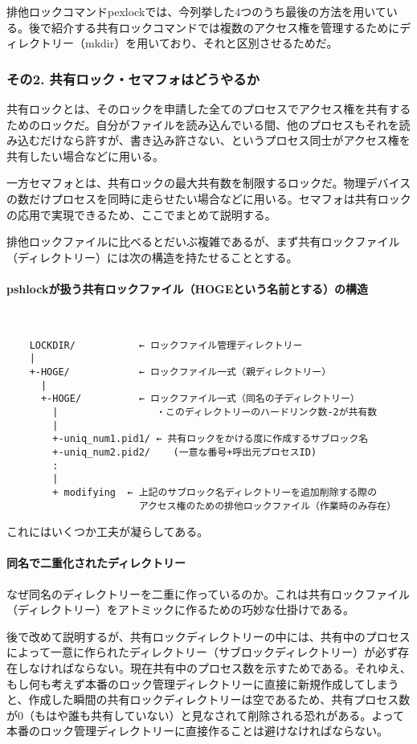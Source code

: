 排他ロックコマンドpexlockでは、今列挙した4つのうち最後の方法を用いている。後で紹介する共有ロックコマンドでは複数のアクセス権を管理するためにディレクトリー（mkdir）を用いており、それと区別させるためだ。

\subsubsection*{その2. 共有ロック・セマフォはどうやるか}
共有ロックとは、そのロックを申請した全てのプロセスでアクセス権を共有するためのロックだ。自分がファイルを読み込んでいる間、他のプロセスもそれを読み込むだけなら許すが、書き込み許さない、というプロセス同士がアクセス権を共有したい場合などに用いる。

一方セマフォとは、共有ロックの最大共有数を制限するロックだ。物理デバイスの数だけプロセスを同時に走らせたい場合などに用いる。セマフォは共有ロックの応用で実現できるため、ここでまとめて説明する。

排他ロックファイルに比べるとだいぶ複雑であるが、まず共有ロックファイル（ディレクトリー）には次の構造を持たせることとする。\paragraph{pshlockが扱う共有ロックファイル（HOGEという名前とする）の構造}　\\
\begin{frameboxit}{160.0mm}
\begin{verbatim}
	LOCKDIR/           ← ロックファイル管理ディレクトリー
	|
	+-HOGE/            ← ロックファイル一式（親ディレクトリー）
	  |
	  +-HOGE/          ← ロックファイル一式（同名の子ディレクトリー）
	    |                 ・このディレクトリーのハードリンク数-2が共有数
	    |
	    +-uniq_num1.pid1/ ← 共有ロックをかける度に作成するサブロック名
	    +-uniq_num2.pid2/    (一意な番号+呼出元プロセスID)
	    :
	    |
	    + modifying  ← 上記のサブロック名ディレクトリーを追加削除する際の
	                   アクセス権のための排他ロックファイル（作業時のみ存在）
\end{verbatim}
\end{frameboxit}
これにはいくつか工夫が凝らしてある。
\paragraph{同名で二重化されたディレクトリー}
なぜ同名のディレクトリーを二重に作っているのか。これは共有ロックファイル（ディレクトリー）をアトミックに作るための巧妙な仕掛けである。

後で改めて説明するが、共有ロックディレクトリーの中には、共有中のプロセスによって一意に作られたディレクトリー（サブロックディレクトリー）が必ず存在しなければならない。現在共有中のプロセス数を示すためである。それゆえ、もし何も考えず本番のロック管理ディレクトリーに直接に新規作成してしまうと、作成した瞬間の共有ロックディレクトリーは空であるため、共有プロセス数が0（もはや誰も共有していない）と見なされて削除される恐れがある。よって本番のロック管理ディレクトリーに直接作ることは避けなければならない。

